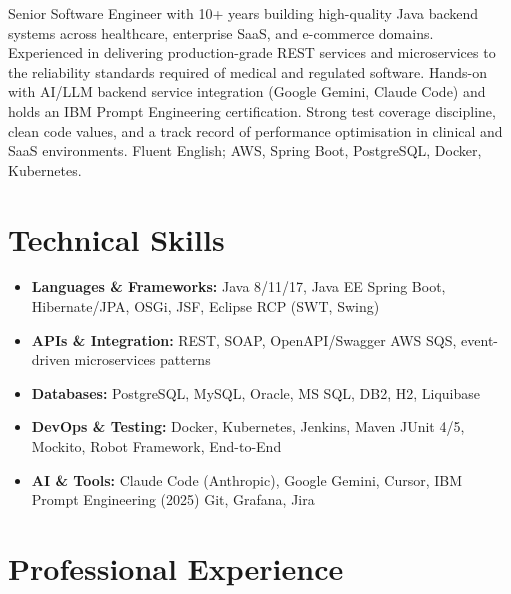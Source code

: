 \documentclass[10pt,a4paper,sans]{moderncv}
\begin{document}
\makecvtitle
\vspace{-10pt}

\small{Senior Software Engineer with 10+ years building high-quality Java backend systems across healthcare, enterprise SaaS, and e-commerce domains. Experienced in delivering production-grade REST services and microservices to the reliability standards required of medical and regulated software. Hands-on with AI/LLM backend service integration (Google Gemini, Claude Code) and holds an IBM Prompt Engineering certification. Strong test coverage discipline, clean code values, and a track record of performance optimisation in clinical and SaaS environments. Fluent English; AWS, Spring Boot, PostgreSQL, Docker, Kubernetes.}

\vspace{2pt}

\section{Technical Skills}
\vspace{1pt}
\begin{itemize}
  \item \textbf{Languages \& Frameworks:} Java 8/11/17, Java EE \textbar{} Spring Boot, Hibernate/JPA, OSGi, JSF, Eclipse RCP (SWT, Swing)
  \item \textbf{APIs \& Integration:} REST, SOAP, OpenAPI/Swagger \textbar{} AWS SQS, event-driven microservices patterns
  \item \textbf{Databases:} PostgreSQL, MySQL, Oracle, MS SQL, DB2, H2, Liquibase
  \item \textbf{DevOps \& Testing:} Docker, Kubernetes, Jenkins, Maven \textbar{} JUnit 4/5, Mockito, Robot Framework, End-to-End
  \item \textbf{AI \& Tools:} Claude Code (Anthropic), Google Gemini, Cursor, IBM Prompt Engineering (2025) \textbar{} Git, Grafana, Jira
\end{itemize}

\section{Professional Experience}
\vspace{1pt}
\end{document}
